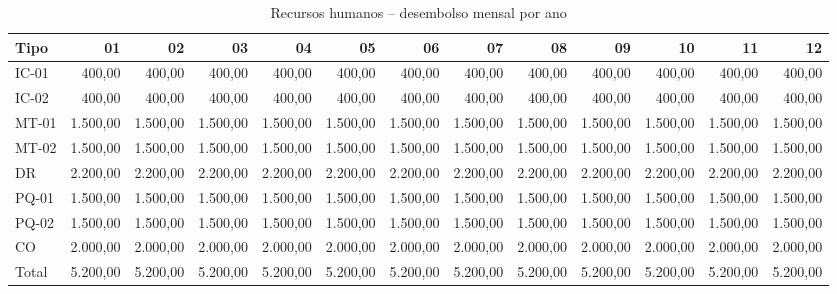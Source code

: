 \begin{table}[h!]
\scriptsize
	\caption{Recursos humanos -- desembolso mensal por ano}
\begin{tabular}{ lrrrrrrrrrrrr}
\toprule
   \rowcolor{lgray}
   Tipo      & 01      & 02      & 03      & 04      & 05      & 06      & 07      & 08      & 09      & 10      & 11      & 12      \\
\midrule
   IC-01     &   400,00&   400,00&   400,00&   400,00&   400,00&   400,00&   400,00&   400,00&   400,00&   400,00&   400,00&   400,00\\
   IC-02     &   400,00&   400,00&   400,00&   400,00&   400,00&   400,00&   400,00&   400,00&   400,00&   400,00&   400,00&   400,00\\
   MT-01     & 1.500,00& 1.500,00& 1.500,00& 1.500,00& 1.500,00& 1.500,00& 1.500,00& 1.500,00& 1.500,00& 1.500,00& 1.500,00& 1.500,00\\
   MT-02     & 1.500,00& 1.500,00& 1.500,00& 1.500,00& 1.500,00& 1.500,00& 1.500,00& 1.500,00& 1.500,00& 1.500,00& 1.500,00& 1.500,00\\
   DR        & 2.200,00& 2.200,00& 2.200,00& 2.200,00& 2.200,00& 2.200,00& 2.200,00& 2.200,00& 2.200,00& 2.200,00& 2.200,00& 2.200,00\\
   PQ-01     & 1.500,00& 1.500,00& 1.500,00& 1.500,00& 1.500,00& 1.500,00& 1.500,00& 1.500,00& 1.500,00& 1.500,00& 1.500,00& 1.500,00\\
   PQ-02     & 1.500,00& 1.500,00& 1.500,00& 1.500,00& 1.500,00& 1.500,00& 1.500,00& 1.500,00& 1.500,00& 1.500,00& 1.500,00& 1.500,00\\
   CO        & 2.000,00& 2.000,00& 2.000,00& 2.000,00& 2.000,00& 2.000,00& 2.000,00& 2.000,00& 2.000,00& 2.000,00& 2.000,00& 2.000,00\\
	\midrule
   Total     & 5.200,00& 5.200,00& 5.200,00& 5.200,00& 5.200,00& 5.200,00& 5.200,00& 5.200,00& 5.200,00& 5.200,00& 5.200,00& 5.200,00\\
   

\end{tabular}
\end{table}
